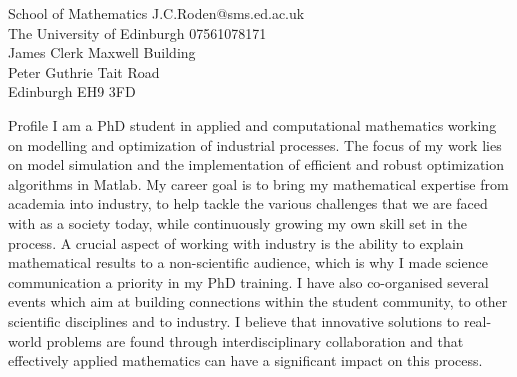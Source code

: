 \documentclass{resume} %
\begin{document}
School of Mathematics \hfill{J.C.Roden@sms.ed.ac.uk} \\
The University of Edinburgh  \hfill{07561078171}\\
James Clerk Maxwell Building\\
Peter Guthrie Tait Road\\
{Edinburgh EH9 3FD}

\begin{rSection}{Profile}
I am a PhD student in applied and computational mathematics working on modelling and optimization of industrial processes. The focus of my work lies on model simulation and the implementation of efficient and robust optimization algorithms in Matlab. My career goal is to bring my mathematical expertise from academia into industry, to help tackle the various challenges that we are faced with as a society today, while continuously growing my own skill set in the process. A crucial aspect of working with industry is the ability to explain mathematical results to a non-scientific audience, which is why I made science communication a priority in my PhD training. I have also co-organised several events which aim at building connections within the student community, to other scientific disciplines and to industry. I believe that innovative solutions to real-world problems are found through interdisciplinary collaboration and that effectively applied mathematics can have a significant impact on this process.
\vspace{0.7 cm}
\end{rSection}
\end{document}
